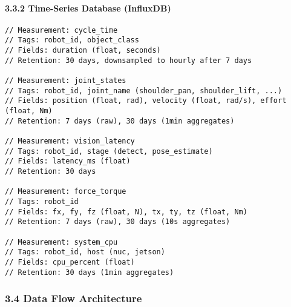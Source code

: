 \documentclass[
]{article}
\begin{document}
\hypertarget{time-series-database-influxdb}{%
\paragraph{3.3.2 Time-Series Database
(InfluxDB)}\label{time-series-database-influxdb}}

\begin{verbatim}
// Measurement: cycle_time
// Tags: robot_id, object_class
// Fields: duration (float, seconds)
// Retention: 30 days, downsampled to hourly after 7 days

// Measurement: joint_states
// Tags: robot_id, joint_name (shoulder_pan, shoulder_lift, ...)
// Fields: position (float, rad), velocity (float, rad/s), effort (float, Nm)
// Retention: 7 days (raw), 30 days (1min aggregates)

// Measurement: vision_latency
// Tags: robot_id, stage (detect, pose_estimate)
// Fields: latency_ms (float)
// Retention: 30 days

// Measurement: force_torque
// Tags: robot_id
// Fields: fx, fy, fz (float, N), tx, ty, tz (float, Nm)
// Retention: 7 days (raw), 30 days (10s aggregates)

// Measurement: system_cpu
// Tags: robot_id, host (nuc, jetson)
// Fields: cpu_percent (float)
// Retention: 30 days (1min aggregates)
\end{verbatim}

\hypertarget{data-flow-architecture}{%
\subsubsection{3.4 Data Flow
Architecture}\label{data-flow-architecture}}
\end{document}
